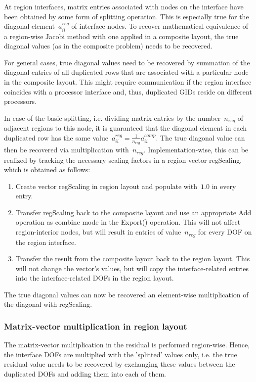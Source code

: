 \documentclass[11pt]{article}
\begin{document}
At region interfaces, matrix entries associated with nodes on the interface 
have been obtained by some form of splitting operation. This is especially true for the diagonal element~$a^{reg}_{ii}$ of interface nodes. 
To recover mathematical equivalence of a region-wise Jacobi method with one applied in a composite layout, 
the true diagonal values (as in the composite problem) needs to be recovered.

For general cases, true diagonal values need to be recovered by summation of the diagonal entries of all duplicated rows 
that are associated with a particular node in the composite layout. 
This might require communication if the region interface coincides with a processor interface 
and, thus, duplicated GIDs reside on different processors.

In case of the basic splitting, i.e. dividing matrix entries by the number~$n_{reg}$ of adjacent regions to this node, it is guaranteed
that the diagonal element in each duplicated row has the same value~$a^{reg}_{ii} = \frac{1}{n_{reg}}a^{comp}_{ii}$. 
The true diagonal value can then be recovered via multiplication with~$n_{reg}$. 
Implementation-wise, this can be realized by tracking the necessary scaling factors in a region vector {\sf regScaling},
which is obtained as follows:
\begin{enumerate}
\item Create vector {\sf regScaling} in region layout and populate with~$1.0$ in every entry.
\item Transfer {\sf regScaling} back to the composite layout and use an appropriate {\sf Add} operation as combine mode in the {\sf Export()} operation. 
This will not affect region-interior nodes, but will result in entries of value~$n_{reg}$ for every DOF on the region interface.
\item Transfer the result from the composite layout back to the region layout. This will not change the vector's values, 
but will copy the interface-related entries into the interface-related DOFs in the region layout.
\end{enumerate}
The true diagonal values can now be recovered an element-wise multiplication of the diagonal with {\sf regScaling}.

\subsubsection{Matrix-vector multiplication in region layout}
\label{sec:RegionalMatVec}

The matrix-vector multiplication in the residual is performed region-wise. 
Hence, the interface DOFs are multiplied with the 'splitted' values only, i.e. the true residual value needs to be recovered 
by exchanging these values between the duplicated DOFs and adding them into each of them.
\end{document}
